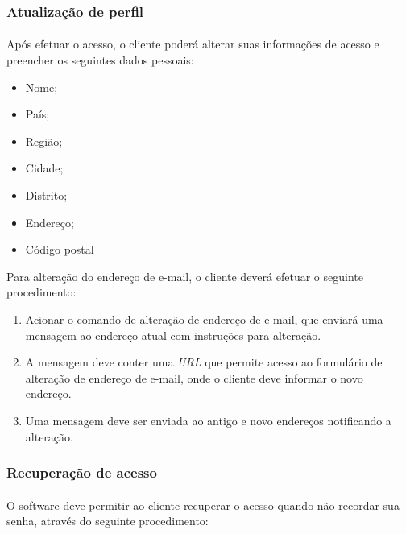\documentclass[a4paper,12pt]{article}
\def\url{\emph{URL}}
\begin{document}
\subsubsection{Atualização de perfil}

\paragraph{}
Após efetuar o acesso, o cliente poderá alterar suas informações de acesso e
preencher os seguintes dados pessoais:

\begin{itemize}
\item Nome;
\item País;
\item Região;
\item Cidade;
\item Distrito;
\item Endereço;
\item Código postal
\end{itemize}

Para alteração do endereço de e-mail, o cliente deverá efetuar o seguinte
procedimento:

\begin{enumerate}
\item Acionar o comando de alteração de endereço de e-mail, que enviará uma
mensagem ao endereço atual com instruções para alteração.
\item A mensagem deve conter uma \url{} que permite acesso ao formulário de
alteração de endereço de e-mail, onde o cliente deve informar o novo endereço.
\item Uma mensagem deve ser enviada ao antigo e novo endereços notificando a
alteração.
\end{enumerate}

\subsubsection{Recuperação de acesso}

\paragraph{}
O software deve permitir ao cliente recuperar o acesso quando não recordar sua
senha, através do seguinte procedimento:
\end{document}
